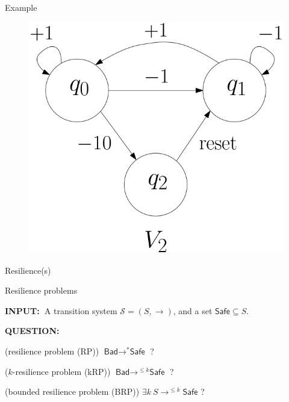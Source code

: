 \documentclass{beamer}
\newcommand{\Bad}{\textsf{Bad}}
\newcommand{\Safe}{\textsf{Safe}}
\begin{document}
  \begin{frame}{Example}
  
  
   \begin{center}
 	\begin{figure}
\includegraphics[width=.50\textwidth]{FigB}
	\end{figure}
\end{center}  

  \end{frame}
  \begin{frame}{Resilience(s)}
  



  
 {\small
  
  
{\sc Resilience problems}

\hspace{-0.5cm}  {\bf INPUT:\ }{A transition system $\mathscr{S}=(S,\rightarrow)$, and a set $\Safe \subseteq S$.}

\hspace{-0.5cm}  {\bf QUESTION:\ }{ ({\sc resilience problem (RP)}) $\Bad \rightarrow^{*} \Safe$ ?

\hspace{-0.5cm}  ({\sc $k$-resilience problem (kRP)})		$\Bad \rightarrow^{\leq k} \Safe$ ?

\hspace{-0.5cm}  ({\sc bounded resilience problem (BRP)})	$\exists k ~ S \rightarrow^{\leq k} \Safe$ ?\newline}

}

  \end{frame}
\end{document}
